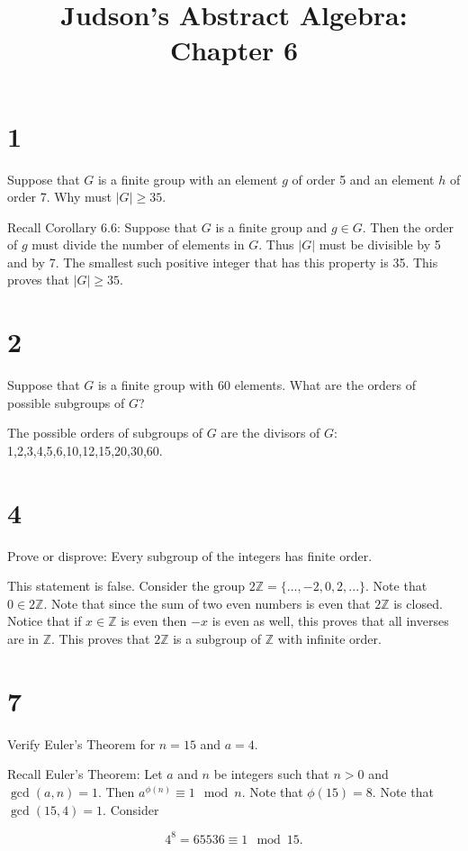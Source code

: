 \documentclass[a4paper]{article}
\title{Judson's Abstract Algebra: Chapter 6}
\date{}
\begin{document}
\maketitle

\section*{1}

Suppose that $G$ is a finite group with an element $g$ of order 5 and an element $h$ of order 7. Why must $|G| \geq 35$.

\vspace{\baselineskip}

Recall Corollary 6.6: Suppose that $G$ is a finite group and $g \in G$. Then the order of $g$ must divide the number of elements in $G$. Thus $|G|$ must be divisible by 5 and by 7. The smallest such positive integer that has this property is 35. This proves that $|G| \geq 35$.


\section*{2}

Suppose that $G$ is a finite group with 60 elements. What are the orders of possible subgroups of $G$?

\vspace{\baselineskip}

The possible orders of subgroups of $G$ are the divisors of $G$: 1,2,3,4,5,6,10,12,15,20,30,60.


\section*{4}

Prove or disprove: Every subgroup of the integers has finite order.

\vspace*{\baselineskip}

This statement is false. Consider the group $2\mathbb{Z} = \{ ..., -2, 0, 2, ... \}$. Note that $0 \in 2\mathbb{Z}$. Note that since the sum of two even numbers is even that $2\mathbb{Z}$ is closed. Notice that if $x \in \mathbb{Z}$ is even then $-x$ is even as well, this proves that all inverses are in $\mathbb{Z}$. This proves that $2\mathbb{Z}$ is a subgroup of $\mathbb{Z}$ with infinite order.


\section*{7}

Verify Euler's Theorem for $n=15$ and $a=4$.

\vspace{\baselineskip}

Recall Euler's Theorem: Let $a$ and $n$ be integers such that $n > 0$ and $\gcd(a,n) = 1$. Then $a^{\phi(n)} \equiv 1 \mod n$. Note that $\phi(15) = 8$. Note that $\gcd(15, 4) = 1$. Consider

$$4^8 = 65536 \equiv 1 \mod 15.$$
\end{document}

